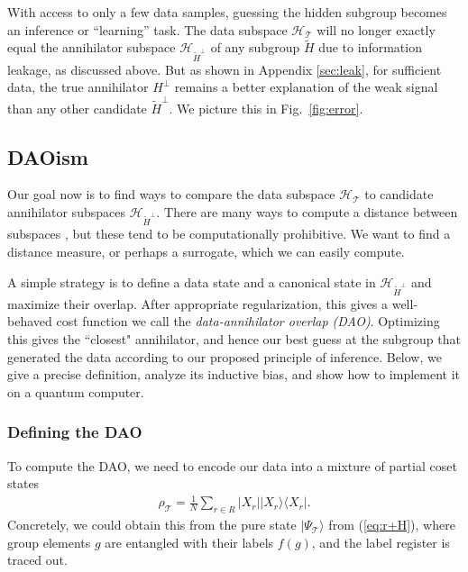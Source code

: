 \documentclass[aps, pre,reprint,nofootinbib,citeautoscript,floatfix]{revtex4-1}
\begin{document}
With access to only a few data samples, guessing the hidden subgroup becomes an inference or ``learning'' task.  The data subspace $\mathcal{H}_\mathcal{T}$ will no longer exactly equal the annihilator subspace $\mathcal{H}_{\tilde{H}^\perp}$ of any subgroup $\tilde{H}$ due to information leakage, as discussed above.
But as shown in Appendix \ref{sec:leak}, for sufficient data, the true annihilator $H^\perp$ remains a better explanation of the weak signal than any other candidate $\tilde{H}^\perp$. We picture this in Fig.~\ref{fig:error}.

\subsection{DAOism}
\label{sec:fourier-cost}


Our goal now is to find ways to compare the data subspace $\mathcal{H}_{\mathcal{T}}$ to candidate annihilator subspaces $\mathcal{H}_{\tilde{H}^\perp}$.
There are many ways to compute a distance between subspaces \cite{ye2016}, but these tend to be computationally prohibitive. We want to find a distance measure, or perhaps a surrogate, which we can easily compute.

A simple strategy is to define a data state and a canonical state in $\mathcal{H}_{\tilde{H}^\perp}$ and maximize their overlap.
After appropriate regularization, this gives a well-behaved cost function we call the \emph{data-annihilator overlap (DAO)}. Optimizing this gives the ``closest" annihilator, and hence our best guess at the subgroup that generated the data according to our proposed principle of inference.
Below, we give a precise definition, analyze its inductive bias, and show how to implement it on a quantum computer.


\subsubsection{Defining the DAO}

To compute the DAO, we need to encode our data into a mixture of partial coset states
\begin{align}
    \rho_\mathcal{T} = \frac{1}{N}\sum_{r\in R} |X_r| |X_r\rangle\langle X_r|. \label{eq:rho_T}
\end{align}
Concretely, we could obtain this from the pure state $|\Psi_\mathcal{T}\rangle$ from (\ref{eq:r+H}), where group elements $g$ are entangled with their labels $f(g)$, and the label register is traced out.
\end{document}
